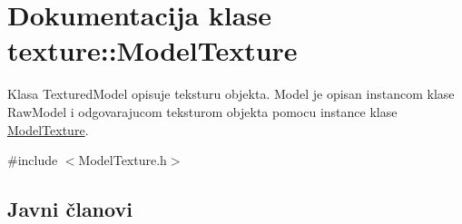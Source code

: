 \hypertarget{classtexture_1_1ModelTexture}{}\section{Dokumentacija klase texture\+:\+:Model\+Texture}
\label{classtexture_1_1ModelTexture}


Klasa Textured\+Model opisuje teksturu objekta. Model je opisan instancom klase Raw\+Model i odgovarajucom teksturom objekta pomocu instance klase \hyperlink{classtexture_1_1ModelTexture}{Model\+Texture}.  




{\ttfamily \#include $<$Model\+Texture.\+h$>$}

\subsection*{Javni članovi}

